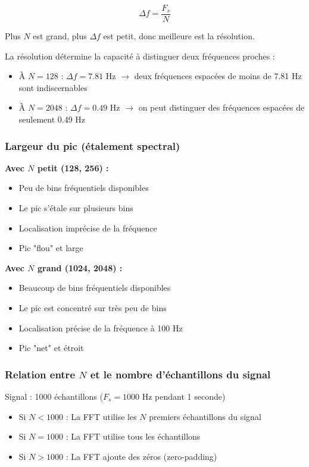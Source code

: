 \documentclass[12pt,a4paper]{article}
\begin{document}
\begin{equation}
    \boxed{\Delta f = \frac{F_s}{N}}
\end{equation}

Plus $N$ est grand, plus $\Delta f$ est petit, donc meilleure est la résolution.

La résolution détermine la capacité à distinguer deux fréquences proches :
\begin{itemize}
    \item À $N = 128$ : $\Delta f = 7.81$ Hz $\rightarrow$ deux fréquences espacées de moins de 7.81 Hz sont indiscernables
    \item À $N = 2048$ : $\Delta f = 0.49$ Hz $\rightarrow$ on peut distinguer des fréquences espacées de seulement 0.49 Hz
\end{itemize}

\subsubsection{Largeur du pic (étalement spectral)}

\textbf{Avec $N$ petit (128, 256) :}
\begin{itemize}
    \item Peu de bins fréquentiels disponibles
    \item Le pic s'étale sur plusieurs bins
    \item Localisation imprécise de la fréquence
    \item Pic "flou" et large
\end{itemize}

\textbf{Avec $N$ grand (1024, 2048) :}
\begin{itemize}
    \item Beaucoup de bins fréquentiels disponibles
    \item Le pic est concentré sur très peu de bins
    \item Localisation précise de la fréquence à 100 Hz
    \item Pic "net" et étroit
\end{itemize}

\subsubsection{Relation entre $N$ et le nombre d'échantillons du signal}

Signal : 1000 échantillons ($F_s = 1000$ Hz pendant 1 seconde)

\begin{itemize}
    \item Si $N < 1000$ : La FFT utilise les $N$ premiers échantillons du signal
    \item Si $N = 1000$ : La FFT utilise tous les échantillons
    \item Si $N > 1000$ : La FFT ajoute des zéros (zero-padding)
\end{itemize}
\end{document}
